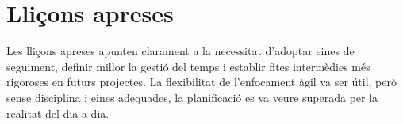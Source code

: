 \section{Lliçons apreses}

Les lliçons apreses apunten clarament a la necessitat d'adoptar eines de seguiment, definir millor la gestió del temps i establir fites intermèdies més rigoroses en futurs projectes. La flexibilitat de l'enfocament àgil va ser útil, però sense disciplina i eines adequades, la planificació es va veure superada per la realitat del dia a dia.

